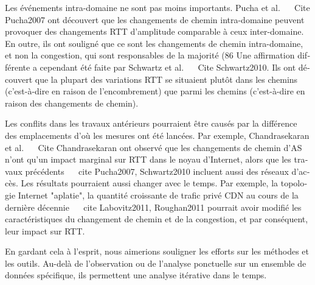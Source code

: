 \begin{otherlanguage}{french}
{Les événements intra-domaine ne sont pas moins importants. Pucha et al. ~ \ Cite {Pucha2007} ont découvert que les changements de chemin intra-domaine peuvent provoquer des changements RTT d'amplitude comparable à ceux inter-domaine.
En outre, ils ont souligné que ce sont les changements de chemin intra-domaine, et non la congestion, qui sont responsables de la majorité (86%
Une affirmation différente a cependant été faite par Schwartz et al. ~ \ Cite {Schwartz2010}. Ils ont découvert que la plupart des variations RTT se situaient plutôt dans les chemins (c'est-à-dire en raison de l'encombrement) que parmi les chemins (c'est-à-dire en raison des changements de chemin).

Les conflits dans les travaux antérieurs pourraient être causés par la différence des emplacements d'où les mesures ont été lancées.
Par exemple, Chandrasekaran et al. ~ \ Cite {Chandrasekaran} ont observé que les changements de chemin d'AS n'ont qu'un impact marginal sur RTT dans le noyau d'Internet, alors que les travaux précédents ~ \ cite {Pucha2007, Schwartz2010} incluent aussi des réseaux d'accès.
Les résultats pourraient aussi changer avec le temps. Par exemple, la topologie Internet "aplatie", la quantité croissante de trafic privé CDN au cours de la dernière décennie ~ \ cite {Labovitz2011, Roughan2011} pourrait avoir modifié les caractéristiques du changement de chemin et de la congestion, et par conséquent, leur impact sur RTT.

En gardant cela à l'esprit, nous aimerions souligner les efforts sur les méthodes et les outils.
Au-delà de l'observation ou de l'analyse ponctuelle sur un ensemble de données spécifique, ils permettent une analyse itérative dans le temps.

}
\end{otherlanguage}
